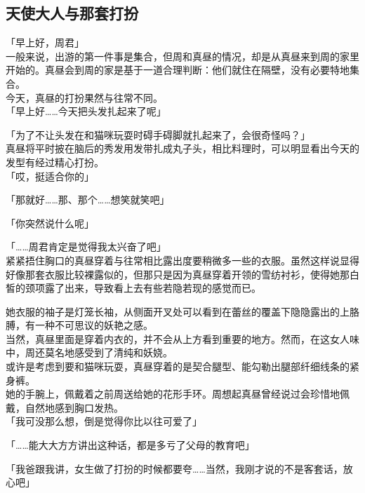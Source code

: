 \subsection{天使大人与那套打扮}

「早上好，周君」\\

一般来说，出游的第一件事是集合，但周和真昼的情况，却是从真昼来到周的家里开始的。真昼会到周的家是基于一道合理判断：他们就住在隔壁，没有必要特地集合。\\

今天，真昼的打扮果然与往常不同。\\

「早上好……今天把头发扎起来了呢」

「为了不让头发在和猫咪玩耍时碍手碍脚就扎起来了，会很奇怪吗？」\\

真昼将平时披在脑后的秀发用发带扎成丸子头，相比料理时，可以明显看出今天的发型有经过精心打扮。\\

「哎，挺适合你的」

「那就好……那、那个……想笑就笑吧」

「你突然说什么呢」

「……周君肯定是觉得我太兴奋了吧」\\

紧紧捂住胸口的真昼穿着与往常相比露出度要稍微多一些的衣服。虽然这样说显得好像那套衣服比较裸露似的，但那只是因为真昼穿着开领的雪纺衬衫，使得她那白皙的颈项露了出来，导致看上去有些若隐若现的感觉而已。

她衣服的袖子是灯笼长袖，从侧面开叉处可以看到在蕾丝的覆盖下隐隐露出的上胳膊，有一种不可思议的妖艳之感。\\

当然，真昼里面是穿着内衣的，并不会从上方看到重要的地方。然而，在这女人味中，周还莫名地感受到了清纯和妖娆。\\

或许是考虑到要和猫咪玩耍，真昼穿着的是契合腿型、能勾勒出腿部纤细线条的紧身裤。\\

她的手腕上，佩戴着之前周送给她的花形手环。周想起真昼曾经说过会珍惜地佩戴，自然地感到胸口发热。\\

「我可没那么想，倒是觉得你比以往可爱了」

「……能大大方方讲出这种话，都是多亏了父母的教育吧」

「我爸跟我讲，女生做了打扮的时候都要夸……当然，我刚才说的不是客套话，放心吧」

